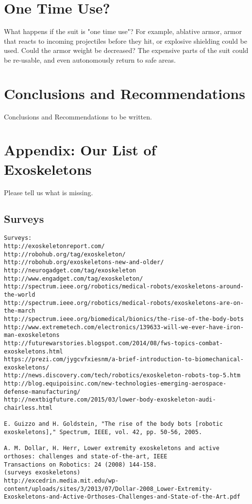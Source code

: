 \documentclass[letterpaper,12pt,fullpage]{article}
\begin{document}
\section{One Time Use?}

What happens if the suit is "one time use"? For example, ablative armor,
armor that reacts to incoming projectiles before they hit,
or explosive shielding could be used. Could the armor weight be decreased?
The expensive parts of the suit could be re-usable, and even autonomously
return to safe areas.

\section{Conclusions and Recommendations}

Conclusions and Recommendations to be written.




\newpage

\section{Appendix: Our List of Exoskeletons}

Please tell us what is missing.

\subsection{Surveys}

\begin{verbatim}
Surveys:
http://exoskeletonreport.com/
http://robohub.org/tag/exoskeleton/
http://robohub.org/exoskeletons-new-and-older/
http://neurogadget.com/tag/exoskeleton
http://www.engadget.com/tag/exoskeleton/
http://spectrum.ieee.org/robotics/medical-robots/exoskeletons-around-the-world
http://spectrum.ieee.org/robotics/medical-robots/exoskeletons-are-on-the-march
http://spectrum.ieee.org/biomedical/bionics/the-rise-of-the-body-bots
http://www.extremetech.com/electronics/139633-will-we-ever-have-iron-man-exoskeletons
http://futurewarstories.blogspot.com/2014/08/fws-topics-combat-exoskeletons.html
https://prezi.com/jygcvfxiesnm/a-brief-introduction-to-biomechanical-exoskeletons/
http://news.discovery.com/tech/robotics/exoskeleton-robots-top-5.htm
http://blog.equipoisinc.com/new-technologies-emerging-aerospace-defense-manufacturing/
http://nextbigfuture.com/2015/03/lower-body-exoskeleton-audi-chairless.html

E. Guizzo and H. Goldstein, "The rise of the body bots [robotic
exoskeletons]," Spectrum, IEEE, vol. 42, pp. 50-56, 2005.

A. M. Dollar, H. Herr, Lower extremity exoskeletons and active
orthoses: challenges and state-of-the-art, IEEE
Transactions on Robotics: 24 (2008) 144-158.
(surveys exoskeletons)
http://excedrin.media.mit.edu/wp-content/uploads/sites/3/2013/07/Dollar-2008_Lower-Extremity-Exoskeletons-and-Active-Orthoses-Challenges-and-State-of-the-Art.pdf
\end{verbatim}
\end{document}
